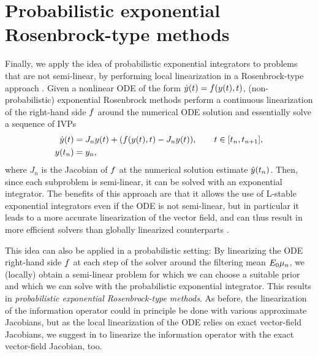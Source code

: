 \documentclass{mimosis}
\begin{document}
\section{Probabilistic exponential Rosenbrock-type methods}
\label{sec:org350a4b8}
\label{sec:rosenbrock}
Finally, we apply the idea of probabilistic exponential integrators to problems that are not semi-linear, by performing local linearization in a Rosenbrock-type approach
\parencite{hochbruck2006explicit,hochbruck2009exponential,Luan2014}.
Given a nonlinear ODE of the form
\(\dot{\val}(t) = \vf(\val(t), t)\),
(non-probabilistic) exponential Rosenbrock methods perform a continuous linearization of the right-hand side \(\vf\) around the numerical ODE solution and essentially solve a sequence of IVPs
\begin{subequations}
\begin{align}
  \label{eq:rosenbrock-ivp}
  \dot{\val}(t) &= J_n \val(t) + \left( \vf(\val(t), t) - J_n \val(t) \right), \qquad t \in [t_n, t_{n+1}], \\
  \val(t_n) &= \val_n,
\end{align}
\end{subequations}
where \(J_n\) is the Jacobian of \(\vf\) at the numerical solution estimate \(\hat{y}(t_n)\).
Then, since each subproblem is semi-linear, it can be solved with an exponential integrator.
The benefits of this approach are that it allows the use of L-stable exponential integrators even if the ODE is not semi-linear, but in particular it leads to a more accurate linearization of the vector field, and can thus result in more efficient solvers than globally linearized counterparts \parencite{hochbruck2009exponential}.

This idea can also be applied in a probabilistic setting:
By linearizing the ODE right-hand side \(\vf\) at each step of the solver around the filtering mean \(E_{0} \mu_n\), we (locally) obtain a semi-linear problem for which we can choose a suitable \IOUP{} prior and which we can solve with the probabilistic exponential integrator.
This results in \emph{probabilistic exponential Rosenbrock-type methods}.
As before, the linearization of the information operator could in principle be done with various approximate Jacobians, but as the local linearization of the ODE relies on exact vector-field Jacobians, we suggest in \probexpint{} to linearize the information operator with the exact vector-field Jacobian, too.
\end{document}
